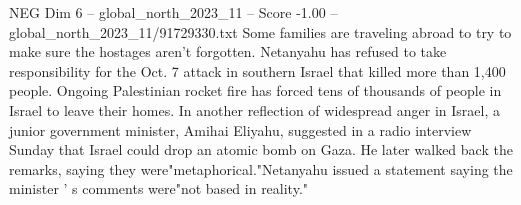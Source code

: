 \begin{textsample}{NEG Dim 6 – global\_north\_2023\_11 – Score -1.00 – global\_north\_2023\_11/91729330.txt}
Some families are traveling abroad to try to make sure the hostages aren't forgotten.
Netanyahu has refused to take responsibility for the Oct. 7 attack in southern Israel that killed more than 1,400 people.
Ongoing Palestinian rocket fire has forced tens of thousands of people in Israel to leave their homes.
In another reflection of widespread anger in Israel, a junior government minister, Amihai Eliyahu, suggested in a radio interview Sunday that Israel could drop an atomic bomb on Gaza.
He later walked back the remarks, saying they were"metaphorical."Netanyahu issued a statement saying the minister ' s comments were"not based in reality."

\end{textsample}
